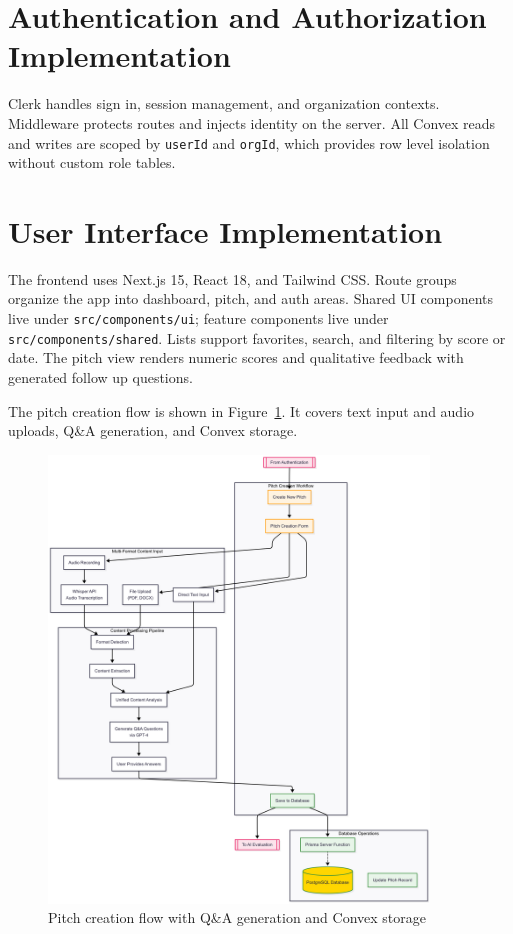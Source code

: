 \section{Authentication and Authorization Implementation}
Clerk handles sign in, session management, and organization contexts. Middleware protects routes and injects identity on the server. All Convex reads and writes are scoped by \texttt{userId} and \texttt{orgId}, which provides row level isolation without custom role tables.

\section{User Interface Implementation}
The frontend uses Next.js 15, React 18, and Tailwind CSS. Route groups organize the app into dashboard, pitch, and auth areas. Shared UI components live under \texttt{src/components/ui}; feature components live under \texttt{src/components/shared}. Lists support favorites, search, and filtering by score or date. The pitch view renders numeric scores and qualitative feedback with generated follow up questions.

The pitch creation flow is shown in Figure~\ref{fig:user-flow-pitch}. It covers text input and audio uploads, Q\&A generation, and Convex storage.

\begin{figure}[H]
  \centering
  \includegraphics[width=0.9\textwidth]{img/user-flow-pitch}
  \caption{Pitch creation flow with Q\&A generation and Convex storage}
  \label{fig:user-flow-pitch}
\end{figure}

